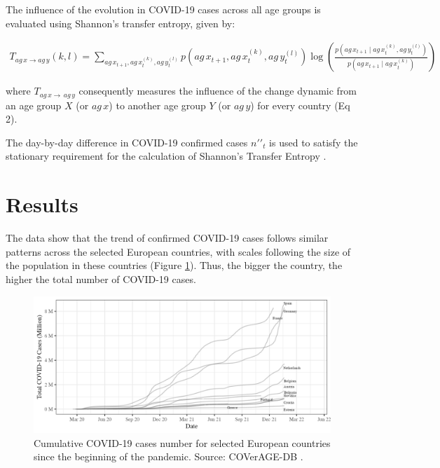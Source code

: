 \documentclass[]{interact}
\theoremstyle{plain}%
\theoremstyle{definition}
\theoremstyle{remark}
\begin{document}
The influence of the evolution in COVID-19 cases across all age groups is evaluated using Shannon's transfer entropy, given by:

\begin{align}
  \tag{2}
  T_{ag\,x \rightarrow ag\,y}(k,l) = \sum_{ag\,x_{t+1}, ag\,x_t^{(k)}, ag\,y_t^{(l)}} 
  p\left(ag\,x_{t+1}, ag\,x_t^{(k)}, ag\,y_t^{(l)}\right) 
  \log \left(\frac{p\left(ag\,x_{t+1} \mid ag\,x_t^{(k)}, ag\,y_t^{(l)}\right)}{p\left(ag\,x_{t+1} \mid ag\,x_t^{(k)}\right)}\right)
\end{align}

\noindent where \(T_{ag\,x \rightarrow\,ag\,y}\) consequently measures the influence of the change dynamic from an age group \(X\) (or \(ag\,x\)) to another age group \(Y\) (or \(ag\,y\)) for every country (Eq 2).

The day-by-day difference in COVID-19 confirmed cases \(n\prime\prime_t\) is used to satisfy the stationary requirement for the calculation of Shannon's Transfer Entropy \citep{shannon1948mathematical, behrendt2019rtransferentropy}.

\section{Results}\label{results}

The data show that the trend of confirmed COVID-19 cases follows similar patterns across the selected European countries, with scales following the size of the population in these countries (Figure \ref{fig:overall}). Thus, the bigger the country, the higher the total number of COVID-19 cases.

\begin{figure}
\includegraphics[width=\textwidth]{manuscript_blind_files/figure-latex/overall-1} \caption{Cumulative COVID-19 cases number for selected European countries since the beginning of the pandemic. Source: COVerAGE-DB \citep{riffe2021data}.}\label{fig:overall}
\end{figure}
\end{document}
